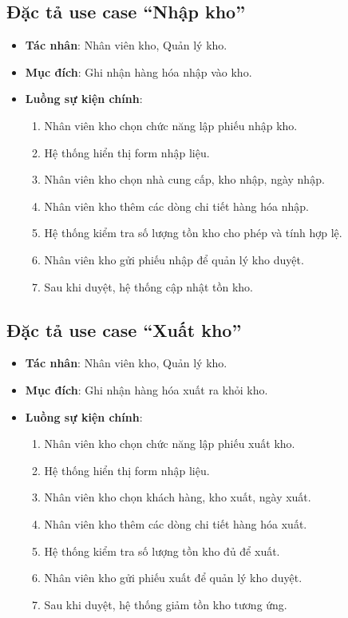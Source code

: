 \subsection{Đặc tả use case ``Nhập kho''}

\begin{itemize}[leftmargin=1.5cm]
    \item \textbf{Tác nhân}: Nhân viên kho, Quản lý kho.
    \item \textbf{Mục đích}: Ghi nhận hàng hóa nhập vào kho.
    \item \textbf{Luồng sự kiện chính}:
    \begin{enumerate}
        \item Nhân viên kho chọn chức năng lập phiếu nhập kho.
        \item Hệ thống hiển thị form nhập liệu.
        \item Nhân viên kho chọn nhà cung cấp, kho nhập, ngày nhập.
        \item Nhân viên kho thêm các dòng chi tiết hàng hóa nhập.
        \item Hệ thống kiểm tra số lượng tồn kho cho phép và tính hợp lệ.
        \item Nhân viên kho gửi phiếu nhập để quản lý kho duyệt.
        \item Sau khi duyệt, hệ thống cập nhật tồn kho.
    \end{enumerate}
\end{itemize}

\subsection{Đặc tả use case ``Xuất kho''}

\begin{itemize}[leftmargin=1.5cm]
    \item \textbf{Tác nhân}: Nhân viên kho, Quản lý kho.
    \item \textbf{Mục đích}: Ghi nhận hàng hóa xuất ra khỏi kho.
    \item \textbf{Luồng sự kiện chính}:
    \begin{enumerate}
        \item Nhân viên kho chọn chức năng lập phiếu xuất kho.
        \item Hệ thống hiển thị form nhập liệu.
        \item Nhân viên kho chọn khách hàng, kho xuất, ngày xuất.
        \item Nhân viên kho thêm các dòng chi tiết hàng hóa xuất.
        \item Hệ thống kiểm tra số lượng tồn kho đủ để xuất.
        \item Nhân viên kho gửi phiếu xuất để quản lý kho duyệt.
        \item Sau khi duyệt, hệ thống giảm tồn kho tương ứng.
    \end{enumerate}
\end{itemize}

